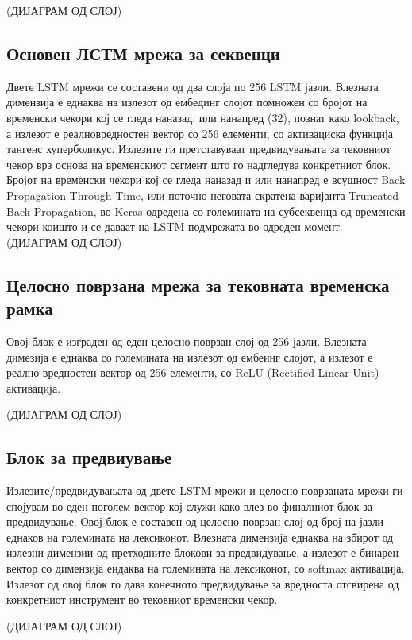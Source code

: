 (ДИЈАГРАМ ОД СЛОЈ)

\subsection{Основен ЛСТМ мрежа за секвенци}

Двете LSTM мрежи се составени од два слоја по 256 LSTM јазли. Влезната димензија е еднаква на излезот од ембединг слојот помножен со бројот на временски чекори кој се гледа наназад, или нанапред (32), познат како lookback, а излезот е реалновредностен вектор со 256 елементи, со активациска функција тангенс хуперболикус. Излезите ги претставуваат предвидувањата за тековниот чекор врз основа на временскиот сегмент што го надгледува конкретниот блок. Бројот на временски чекори кој се гледа наназад и или нанапред е всушност Back Propagation Through Time, или поточно неговата скратена варијанта Truncated Back Propagation, во Keras одредена со големината на субсеквенца од временски чекори коишто и се даваат на LSTM подмрежата во одреден момент. 
(ДИЈАГРАМ ОД СЛОЈ)

\subsection{Целосно поврзана мрежа за тековната временска рамка}

Овој блок е изграден од еден целосно поврзан слој од 256 јазли. Влезната димезија е еднаква со големината на излезот од ембеинг слојот, а излезот е реално вредностен вектор од 256 елементи, со ReLU (Rectified Linear Unit) активација.

(ДИЈАГРАМ ОД СЛОЈ)

\subsection{Блок за предвиување}

Излезите/предвидувањата од двете LSTM мрежи и целосно поврзаната мрежи ги спојувам во еден поголем вектор кој служи како влез во финалниот блок за предвидување. Овој блок е составен од целосно поврзан слој од број на јазли еднаков на големината на лексиконот. Влезната димензија еднаква на збирот од излезни димензии од претходните блокови за предвидување, а излезот е бинарен вектор со димензија ендаква на големината на лексиконот, со softmax активација. Излезот од овој блок го дава конечното предвидување за вредноста отсвирена од конкретниот инструмент во тековниот временски чекор.

(ДИЈАГРАМ ОД СЛОЈ)

